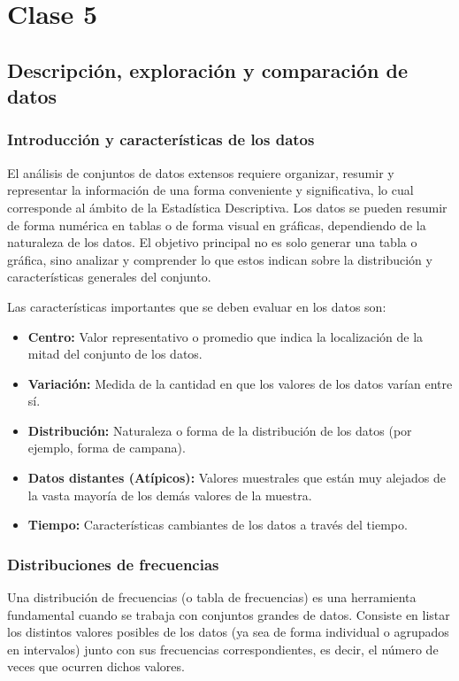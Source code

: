 \chapter{Clase 5}

\section{Descripción, exploración y comparación de datos}

\subsection{Introducción y características de los datos}
El análisis de conjuntos de datos extensos requiere organizar, resumir y representar la información de una forma conveniente y significativa, lo cual corresponde al ámbito de la Estadística Descriptiva. Los datos se pueden resumir de forma numérica en tablas o de forma visual en gráficas, dependiendo de la naturaleza de los datos. El objetivo principal no es solo generar una tabla o gráfica, sino analizar y comprender lo que estos indican sobre la distribución y características generales del conjunto.

Las características importantes que se deben evaluar en los datos son:
\begin{itemize}
    \item \textbf{Centro:} Valor representativo o promedio que indica la localización de la mitad del conjunto de los datos.
    \item \textbf{Variación:} Medida de la cantidad en que los valores de los datos varían entre sí.
    \item \textbf{Distribución:} Naturaleza o forma de la distribución de los datos (por ejemplo, forma de campana).
    \item \textbf{Datos distantes (Atípicos):} Valores muestrales que están muy alejados de la vasta mayoría de los demás valores de la muestra.
    \item \textbf{Tiempo:} Características cambiantes de los datos a través del tiempo.
\end{itemize}

\subsection{Distribuciones de frecuencias}
Una distribución de frecuencias (o tabla de frecuencias) es una herramienta fundamental cuando se trabaja con conjuntos grandes de datos. Consiste en listar los distintos valores posibles de los datos (ya sea de forma individual o agrupados en intervalos) junto con sus frecuencias correspondientes, es decir, el número de veces que ocurren dichos valores.

